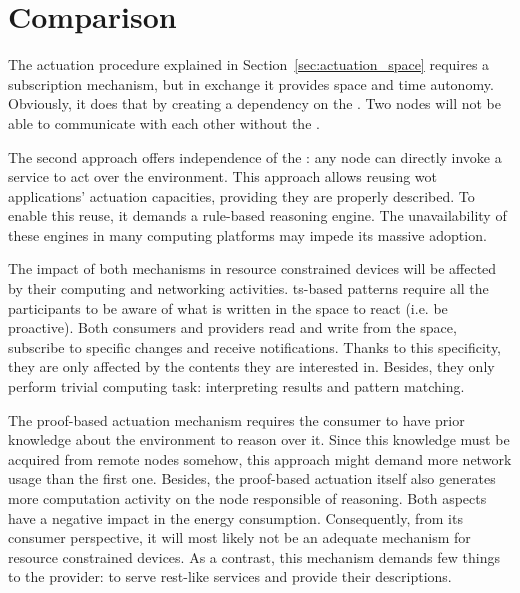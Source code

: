 \section{Comparison}
\label{sec:actuation_comparison}

The actuation procedure explained in Section~\ref{sec:actuation_space} requires a subscription mechanism, but in exchange it provides space and time autonomy.
Obviously, it does that by creating a dependency on the \Space{}.
Two nodes will not be able to communicate with each other without the \Space{}.


The second approach offers independence of the \Space{}: any node can directly invoke a service to act over the environment.
This approach allows reusing \ac{wot} applications' actuation capacities, providing they are properly described. %
To enable this reuse, it demands a rule-based reasoning engine. %
The unavailability of these engines in many computing platforms may impede its massive adoption. %





\bigskip

The impact of both mechanisms in resource constrained devices will be affected by their computing and networking activities.
\ac{ts}-based patterns require all the participants to be aware of what is written in the space to react (i.e. be proactive).
Both consumers and providers read and write from the space, subscribe to specific changes and receive notifications.
Thanks to this specificity, they are only affected by the contents they are interested in. %
Besides, they only perform trivial computing task: interpreting results and pattern matching. %


The proof-based actuation mechanism requires the consumer to have prior knowledge about the environment to reason over it. %
Since this knowledge must be acquired from remote nodes somehow, this approach might demand more network usage than the first one.
Besides, the proof-based actuation itself also generates more computation activity on the node responsible of reasoning.
Both aspects have a negative impact in the energy consumption.
Consequently, from its consumer perspective, it will most likely not be an adequate mechanism for resource constrained devices.
As a contrast, this mechanism demands few things to the provider: to serve \ac{rest}-like services and provide their descriptions. %


